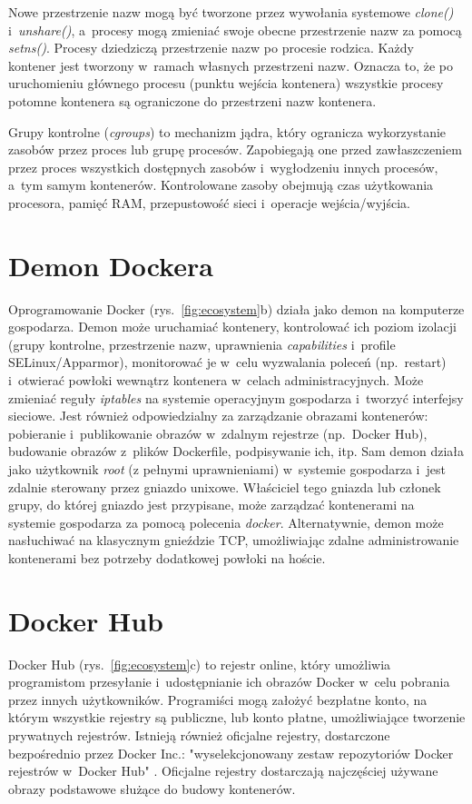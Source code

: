 Nowe przestrzenie nazw mogą być tworzone przez wywołania systemowe \textit{clone()} i~\textit{unshare()}, a~procesy mogą zmieniać swoje obecne przestrzenie nazw za pomocą \textit{setns()}. Procesy dziedziczą przestrzenie nazw po procesie rodzica. Każdy kontener jest tworzony w~ramach własnych przestrzeni nazw. Oznacza to, że po uruchomieniu głównego procesu (punktu wejścia kontenera) wszystkie procesy potomne kontenera są ograniczone do przestrzeni nazw kontenera.

Grupy kontrolne (\textit{cgroups}) to mechanizm jądra, który ogranicza wykorzystanie zasobów przez proces lub grupę procesów. Zapobiegają one przed zawłaszczeniem przez proces wszystkich dostępnych zasobów i~wygłodzeniu innych procesów, a~tym samym kontenerów. Kontrolowane zasoby obejmują czas użytkowania procesora, pamięć RAM, przepustowość sieci i~operacje wejścia/wyjścia.

\section{Demon Dockera}

Oprogramowanie Docker (rys.~\ref{fig:ecosystem}b) działa jako demon na komputerze gospodarza. Demon może uruchamiać kontenery, kontrolować ich poziom izolacji (grupy kontrolne, przestrzenie nazw, uprawnienia \textit{capabilities} i~profile SELinux/Apparmor), monitorować je w~celu wyzwalania poleceń (np.~restart) i~otwierać powłoki wewnątrz kontenera w~celach administracyjnych. Może zmieniać reguły \textit{iptables} na systemie operacyjnym gospodarza i~tworzyć interfejsy sieciowe. Jest również odpowiedzialny za zarządzanie obrazami kontenerów: pobieranie i~publikowanie obrazów w~zdalnym rejestrze (np.~Docker Hub), budowanie obrazów z~plików Dockerfile, podpisywanie ich, itp. Sam demon działa jako użytkownik \textit{root} (z pełnymi uprawnieniami) w~systemie gospodarza i~jest zdalnie sterowany przez gniazdo unixowe. Właściciel tego gniazda lub członek grupy, do której gniazdo jest przypisane, może zarządzać kontenerami na systemie gospodarza za pomocą polecenia \textit{docker}. Alternatywnie, demon może nasłuchiwać na klasycznym gnieździe TCP, umożliwiając zdalne administrowanie kontenerami bez potrzeby dodatkowej powłoki na hoście.

\section{Docker Hub}

Docker Hub (rys.~\ref{fig:ecosystem}c) to rejestr online, który umożliwia programistom przesyłanie i~udostępnianie ich obrazów Docker w~celu pobrania przez innych użytkowników. Programiści mogą założyć bezpłatne konto, na którym wszystkie rejestry są publiczne, lub konto płatne, umożliwiające tworzenie prywatnych rejestrów. Istnieją również oficjalne rejestry, dostarczone bezpośrednio przez Docker Inc.: "wyselekcjonowany zestaw repozytoriów Docker rejestrów w~Docker Hub" \cite{DockerOfficialImages}. Oficjalne rejestry dostarczają najczęściej używane obrazy podstawowe służące do budowy kontenerów.

